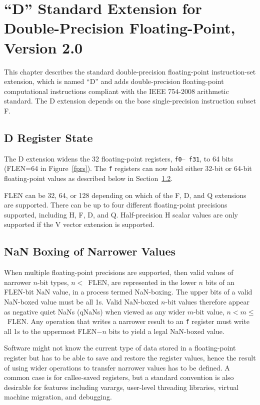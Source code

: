 \chapter{``D'' Standard Extension for Double-Precision Floating-Point,
Version 2.0}

This chapter describes the standard double-precision floating-point
instruction-set extension, which is named ``D'' and adds
double-precision floating-point computational instructions compliant
with the IEEE 754-2008 arithmetic standard.  The D extension depends on
the base single-precision instruction subset F.

\section{D Register State}

The D extension widens the 32 floating-point registers, {\tt f0}--{\tt
  f31}, to 64 bits (FLEN=64 in Figure~\ref{fprs}).  The {\tt f}
registers can now hold either 32-bit or 64-bit floating-point values
as described below in Section~\ref{nanboxing}.

\begin{commentary}
FLEN can be 32, 64, or 128 depending on which of the F, D, and Q
extensions are supported.  There can be up to four different
floating-point precisions supported, including H, F, D, and Q.
Half-precision H scalar values are only supported if the V vector
extension is supported.
\end{commentary}

\section{NaN Boxing of Narrower Values}
\label{nanboxing}

When multiple floating-point precisions are supported, then valid
values of narrower $n$-bit types, \mbox{$n<$ FLEN}, are represented in
the lower $n$ bits of an FLEN-bit NaN value, in a process termed
NaN-boxing.  The upper bits of a valid NaN-boxed value must be all 1s.
Valid NaN-boxed $n$-bit values therefore appear as negative quiet NaNs
(qNaNs) when viewed as any wider $m$-bit value, \mbox{$n < m \leq$
  FLEN}.  Any operation that writes a narrower result to an {\tt f}
register must write all 1s to the uppermost FLEN$-n$ bits to yield a
legal NaN-boxed value.

\begin{samepage-commentary}
Software might not know the current type of data stored in a
floating-point register but has to be able to save and restore the
register values, hence the result of using wider operations to
transfer narrower values has to be defined.  A common case is for
callee-saved registers, but a standard convention is also desirable for
features including varargs, user-level threading libraries, virtual
machine migration, and debugging.
\end{samepage-commentary}

